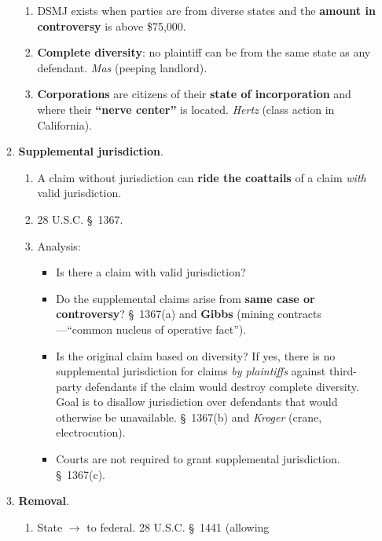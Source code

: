 \begin{enumerate}
\begin{enumerate}
\begin{enumerate}
            \item DSMJ exists when parties are from diverse states and the 
            \textbf{amount in controversy} is above \$75,000.
            \item \textbf{Complete diversity}: no plaintiff can be from the 
            same state as any defendant. \emph{Mas} (peeping landlord).
            \item \textbf{Corporations} are citizens of their \textbf{state of 
            incorporation} and where their \textbf{``nerve center''} is 
            located. \emph{Hertz} (class action in California).
        \end{enumerate}
        \item \textbf{Supplemental jurisdiction}.
        \begin{enumerate}
            \item A claim without jurisdiction can \textbf{ride the coattails} 
            of a claim \emph{with} valid jurisdiction.
            \item 28 U.S.C. \S\ 1367.
            \item Analysis:
            \begin{itemize}
                \item Is there a claim with valid jurisdiction?
                \item Do the supplemental claims arise from \textbf{same case 
                or controversy}? \S\ 1367(a) and \textbf{Gibbs} (mining 
                contracts---``common nucleus of operative fact'').
                \item Is the original claim based on diversity? If yes, there 
                is no supplemental jurisdiction for claims \emph{by 
                plaintiffs} against third-party defendants if the claim would 
                destroy complete diversity. Goal is to disallow jurisdiction 
                over defendants that would otherwise be unavailable. \S\ 
                1367(b) and \emph{Kroger} (crane, electrocution).
                \item Courts are not required to grant supplemental 
                jurisdiction. \S\ 1367(c).
            \end{itemize}
        \end{enumerate}
        \item \textbf{Removal}.
        \begin{enumerate}
            \item State $\rightarrow$ to federal. 28 U.S.C. \S\ 1441 (allowing 

\end{enumerate}
\end{enumerate}
\end{enumerate}
